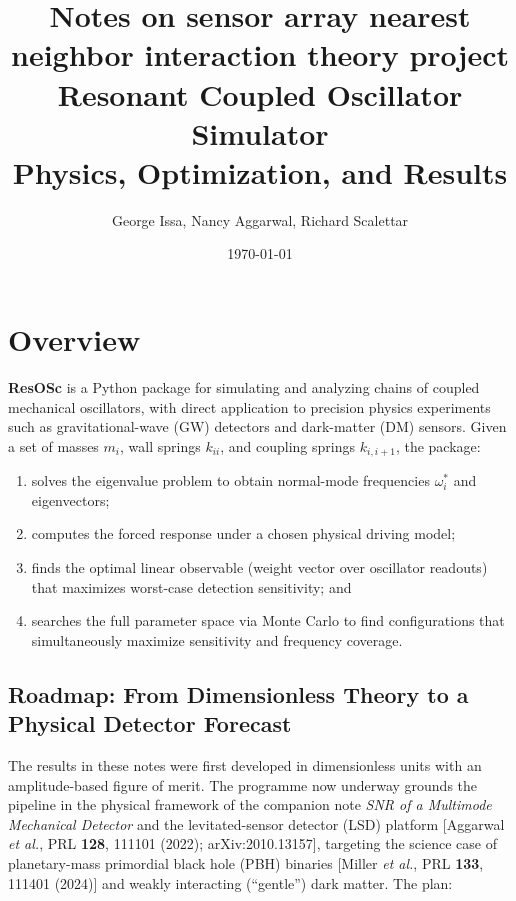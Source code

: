 \documentclass[11pt, letterpaper]{article}
\title{\textbf{Notes on sensor array nearest neighbor interaction theory project}\\[0.4em]
  \large Resonant Coupled Oscillator Simulator \\
  Physics, Optimization, and Results}
\author{George Issa, Nancy Aggarwal, Richard Scalettar}
\date{\today}
\begin{document}
\maketitle
\tableofcontents
\newpage

\section{Overview}

\textbf{ResOSc} is a Python package for simulating and analyzing chains of
coupled mechanical oscillators, with direct application to precision physics
experiments such as gravitational-wave (GW) detectors and dark-matter (DM)
sensors.  Given a set of masses $m_i$, wall springs $k_{ii}$, and coupling
springs $k_{i,i+1}$, the package:
\begin{enumerate}[noitemsep]
  \item solves the eigenvalue problem to obtain normal-mode frequencies
        $\omega_i^*$ and eigenvectors;
  \item computes the forced response under a chosen physical driving model;
  \item finds the optimal linear observable (weight vector over oscillator
        readouts) that maximizes worst-case detection sensitivity; and
  \item searches the full parameter space via Monte Carlo to find
        configurations that simultaneously maximize sensitivity and frequency
        coverage.
\end{enumerate}

\subsection{Roadmap: From Dimensionless Theory to a Physical Detector
Forecast}
\label{sec:roadmap}

The results in these notes were first developed in dimensionless units with
an amplitude-based figure of merit.  The programme now underway grounds the
pipeline in the physical framework of the companion note \emph{SNR of a
Multimode Mechanical Detector} and the levitated-sensor detector (LSD)
platform [Aggarwal \emph{et al.}, PRL \textbf{128}, 111101 (2022);
arXiv:2010.13157], targeting the science case of planetary-mass primordial
black hole (PBH) binaries [Miller \emph{et al.}, PRL \textbf{133}, 111401
(2024)] and weakly interacting (``gentle'') dark matter.  The plan:
\end{document}
